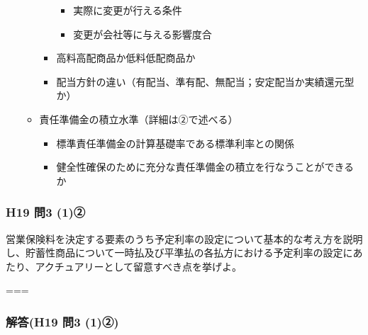 \documentclass[
]{article}
\providecommand{\tightlist}{%
  \setlength{\itemsep}{0pt}\setlength{\parskip}{0pt}}
\begin{document}
\begin{itemize}
\begin{itemize}
\begin{itemize}
      \begin{itemize}
      \tightlist
      \item
        実際に変更が行える条件
      \item
        変更が会社等に与える影響度合
      \end{itemize}
    \item
      高料高配商品か低料低配商品か
    \item
      配当方針の違い（有配当、準有配、無配当；安定配当か実績還元型か）
    \end{itemize}
  \item
    責任準備金の積立水準（詳細は②で述べる）

    \begin{itemize}
    \tightlist
    \item
      標準責任準備金の計算基礎率である標準利率との関係
    \item
      健全性確保のために充分な責任準備金の積立を行なうことができるか
    \end{itemize}
  \end{itemize}
\end{itemize}

\hypertarget{h19-ux554f3-1ux2461}{%
\subsubsection{H19 問3 (1)②}\label{h19-ux554f3-1ux2461}}

営業保険料を決定する要素のうち予定利率の設定について基本的な考え方を説明し、貯蓄性商品について一時払及び平準払の各払方における予定利率の設定にあたり、アクチュアリーとして留意すべき点を挙げよ。

===

\hypertarget{ux89e3ux7b54h19-ux554f3-1ux2461}{%
\subsubsection{解答(H19 問3
(1)②)}\label{ux89e3ux7b54h19-ux554f3-1ux2461}}
\end{document}
